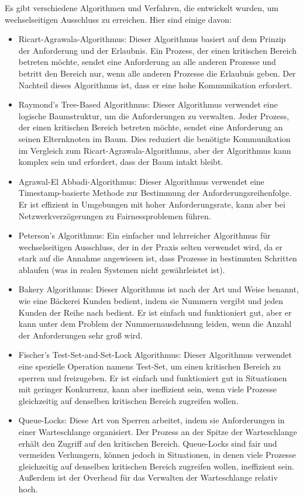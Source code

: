 Es gibt verschiedene Algorithmen und Verfahren, die entwickelt wurden, um wechselseitigen Ausschluss zu erreichen. Hier sind einige davon:
\begin{itemize}
\item Ricart-Agrawala-Algorithmus: Dieser Algorithmus basiert auf dem Prinzip der Anforderung und der Erlaubnis. Ein Prozess, der einen kritischen Bereich betreten möchte, sendet eine Anforderung an alle anderen Prozesse und betritt den Bereich nur, wenn alle anderen Prozesse die Erlaubnis geben. Der Nachteil dieses Algorithmus ist, dass er eine hohe Kommunikation erfordert.

\item Raymond's Tree-Based Algorithmus: Dieser Algorithmus verwendet eine logische Baumstruktur, um die Anforderungen zu verwalten. Jeder Prozess, der einen kritischen Bereich betreten möchte, sendet eine Anforderung an seinen Elternknoten im Baum. Dies reduziert die benötigte Kommunikation im Vergleich zum Ricart-Agrawala-Algorithmus, aber der Algorithmus kann komplex sein und erfordert, dass der Baum intakt bleibt.

\item Agrawal-El Abbadi-Algorithmus: Dieser Algorithmus verwendet eine Timestamp-basierte Methode zur Bestimmung der Anforderungsreihenfolge. Er ist effizient in Umgebungen mit hoher Anforderungsrate, kann aber bei Netzwerkverzögerungen zu Fairnessproblemen führen.

\item Peterson's Algorithmus: Ein einfacher und lehrreicher Algorithmus für wechselseitigen Ausschluss, der in der Praxis selten verwendet wird, da er stark auf die Annahme angewiesen ist, dass Prozesse in bestimmten Schritten ablaufen (was in realen Systemen nicht gewährleistet ist).

\item Bakery Algorithmus: Dieser Algorithmus ist nach der Art und Weise benannt, wie eine Bäckerei Kunden bedient, indem sie Nummern vergibt und jeden Kunden der Reihe nach bedient. Er ist einfach und funktioniert gut, aber er kann unter dem Problem der Nummernausdehnung leiden, wenn die Anzahl der Anforderungen sehr groß wird.

\item  Fischer's Test-Set-and-Set-Lock Algorithmus: Dieser Algorithmus verwendet eine spezielle Operation namens Test-Set, um einen kritischen Bereich zu sperren und freizugeben. Er ist einfach und funktioniert gut in Situationen mit geringer Konkurrenz, kann aber ineffizient sein, wenn viele Prozesse gleichzeitig auf denselben kritischen Bereich zugreifen wollen.

\item  Queue-Locks: Diese Art von Sperren arbeitet, indem sie Anforderungen in einer Warteschlange organisiert. Der Prozess an der Spitze der Warteschlange erhält den Zugriff auf den kritischen Bereich. Queue-Locks sind fair und vermeiden Verhungern, können jedoch in Situationen, in denen viele Prozesse gleichzeitig auf denselben kritischen Bereich zugreifen wollen, ineffizient sein. Außerdem ist der Overhead für das Verwalten der Warteschlange relativ hoch.
\end{itemize}

